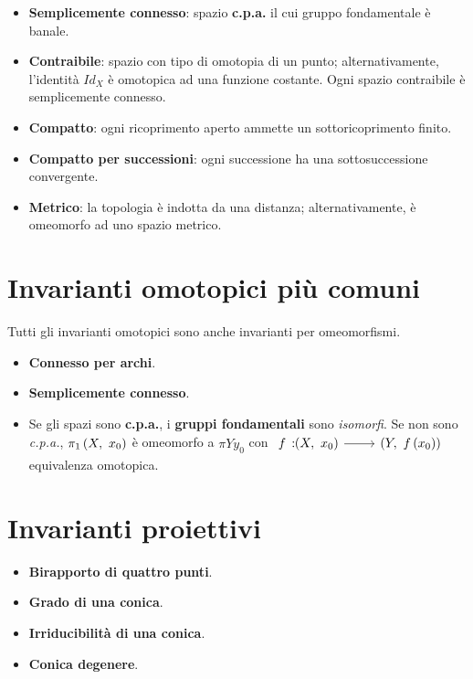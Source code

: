 \begin{multicols}{2}
\begin{itemize}
	\item \textbf{Semplicemente connesso}: spazio \textbf{c.p.a.} il cui gruppo fondamentale è banale.
	\item \textbf{Contraibile}: spazio con tipo di omotopia di un punto; alternativamente, l'identità $Id_X$ è omotopica ad una funzione costante. Ogni spazio contraibile è semplicemente connesso.
\end{itemize}
\textls{\textsc{\textcolor{reddo}{Compattezza}}}
\begin{itemize}
	\item \textbf{Compatto}: ogni ricoprimento aperto ammette un sottoricoprimento finito.
	\item \textbf{Compatto per successioni}: ogni successione ha una sottosuccessione convergente.
\end{itemize}
\textls{\textsc{\textcolor{reddo}{Metrica}}}
\begin{itemize}
	\item \textbf{Metrico}: la topologia è indotta da una distanza; alternativamente, è omeomorfo ad uno spazio metrico.
\end{itemize}
\end{multicols}
\section{Invarianti omotopici più comuni}
Tutti gli invarianti omotopici sono anche invarianti per omeomorfismi.
\begin{multicols}{2}
\begin{itemize}
	\item \textbf{Connesso per archi}.
	\item \textbf{Semplicemente connesso}.
	\item Se gli spazi sono \textbf{c.p.a.}, i \textbf{gruppi fondamentali} sono \textit{isomorfi}. Se non sono \textit{c.p.a.}, $\gruf{X}{x_0}$ è omeomorfo a $\pi{Y}{y_0}$ con $\funz{f}{\left(X,\ x_0\right)}{\left(Y,\ f\left(x_0\right)\right)}$ equivalenza omotopica.
\end{itemize}
\end{multicols}
\section{Invarianti proiettivi}
\begin{multicols}{2}
\begin{itemize}
	\item \textbf{Birapporto di quattro punti}.
	\item \textbf{Grado di una conica}.
	\item \textbf{Irriducibilità di una conica}.
	\item \textbf{Conica degenere}.
\end{itemize}	
\end{multicols}